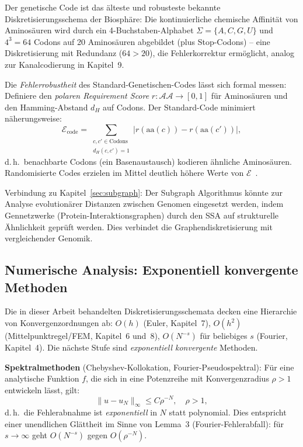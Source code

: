 ﻿\documentclass[a4paper,12pt]{article}
\theoremstyle{definition}
\begin{document}
Der genetische Code ist das älteste und robusteste bekannte Diskretisierungsschema der
Biosphäre: Die kontinuierliche chemische Affinität von Aminosäuren wird durch ein
4-Buchstaben-Alphabet $\Sigma = \{A, C, G, U\}$ und $4^3 = 64$ Codons auf 20 Aminosäuren
abgebildet (plus Stop-Codons) -- eine Diskretisierung mit Redundanz ($64 > 20$), die
Fehlerkorrektur ermöglicht, analog zur Kanalcodierung in Kapitel~9.

Die \emph{Fehlerrobustheit} des Standard-Genetischen-Codes lässt sich formal messen:
Definiere den \emph{polaren Requirement Score} $r : \mathcal{AA} \to [0,1]$ für
Aminosäuren und den Hamming-Abstand $d_H$ auf Codons. Der Standard-Code minimiert
näherungsweise:
\[
\mathcal{E}_{\mathrm{code}} = \sum_{\substack{c, c' \in \text{Codons} \\ d_H(c,c')=1}} |r(\mathrm{aa}(c)) - r(\mathrm{aa}(c'))|,
\]
d.\,h.\ benachbarte Codons (ein Basenaustausch) kodieren ähnliche Aminosäuren. Randomisierte
Codes erzielen im Mittel deutlich höhere Werte von $\mathcal{E}$~\cite{freeland1998}.

Verbindung zu Kapitel~\ref{sec:subgraph}: Der Subgraph Algorithmus könnte zur
Analyse evolutionärer Distanzen zwischen Genomen eingesetzt werden, indem
Gennetzwerke (Protein-Interaktionsgraphen) durch den SSA auf strukturelle Ähnlichkeit
geprüft werden. Dies verbindet die Graphendiskretisierung mit vergleichender Genomik.

\subsection{Numerische Analysis: Exponentiell konvergente Methoden}

Die in dieser Arbeit behandelten Diskretisierungsschemata decken eine Hierarchie von
Konvergenzordnungen ab: $O(h)$ (Euler, Kapitel~7), $O(h^2)$ (Mittelpunktregel/FEM,
Kapitel~6 und~8), $O(N^{-s})$ für beliebiges $s$ (Fourier, Kapitel~4). Die nächste Stufe
sind \emph{exponentiell konvergente} Methoden.

\textbf{Spektralmethoden} (Chebyshev-Kollokation, Fourier-Pseudospektral): Für eine
analytische Funktion $f$, die sich in eine Potenzreihe mit Konvergenzradius $\rho > 1$
entwickeln lässt, gilt:
\[
\|u - u_N\|_\infty \leq C \rho^{-N}, \quad \rho > 1,
\]
d.\,h.\ die Fehlerabnahme ist \emph{exponentiell} in $N$ statt polynomial. Dies entspricht
einer unendlichen Glättheit im Sinne von Lemma~3 (Fourier-Fehlerabfall): für $s \to \infty$
geht $O(N^{-s})$ gegen $O(\rho^{-N})$.
\end{document}
